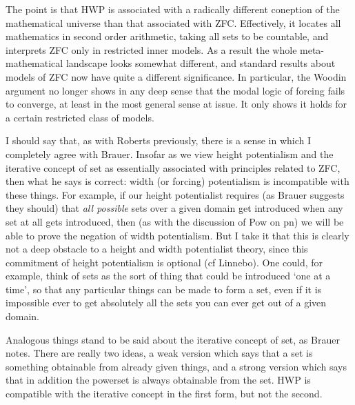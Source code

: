 \documentclass{article}
\begin{document}
The point is that HWP is associated with a radically different coneption of 
the mathematical universe than that associated with ZFC. 
Effectively, it locates all mathematics in second order arithmetic,
taking all sets to be countable, and 
interprets ZFC only in restricted inner models. As a result the 
whole meta-mathematical landscape looks somewhat different, and standard 
results about models of ZFC now have quite a different significance. 
In particular,
the Woodin argument no longer shows in any deep sense that the modal logic 
of forcing fails to converge, at least in the most general sense at issue.
It only shows it holds for a certain restricted class of models.

I should say that, as with Roberts previously, there is a sense in which 
I completely agree with Brauer. Insofar as we view height potentialism 
and the iterative concept of set as essentially associated with principles related 
to ZFC, then what he says is correct: width (or forcing) potentialism is incompatible with these things.
For example, if our height potentialist requires (as Brauer suggests they should)
that \emph{all possible} sets over a given domain get introduced when any set 
at all gets introduced, then (as with the discussion of Pow on pn) we will 
be able to prove the negation of width potentialism. But I take it that this 
is clearly not a deep obstacle to a height and width potentialist theory, 
since this commitment of height potentialism is optional (cf Linnebo).
One could, for example, think of sets as the sort of thing that could be introduced 
`one at a time', so that 
any particular things can be  made to form a set, even if it is impossible ever 
to get absolutely all the sets you can ever get out of a given domain. 

Analogous things stand to be said about the iterative concept of set, as Brauer 
notes. There 
are really two ideas, a weak version which says that a set is something obtainable 
from already given things, and  a strong version which says that in addition 
the powerset is always obtainable from the set. HWP is compatible with the iterative concept 
in the first form, but not the second. 
\end{document}
